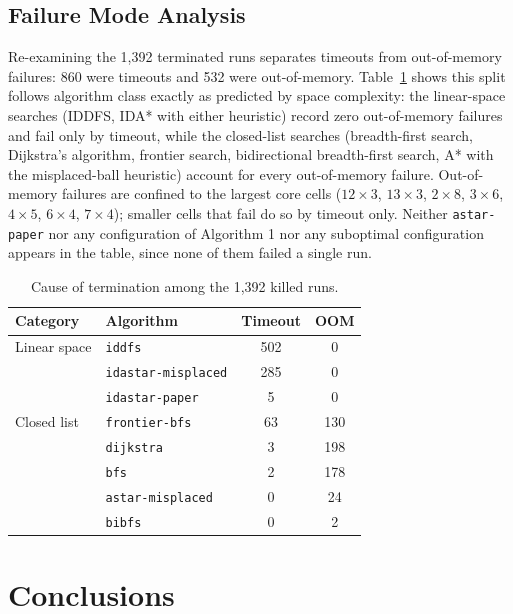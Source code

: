 \documentclass[letterpaper]{article}
\begin{document}
\subsection{Failure Mode Analysis}

Re-examining the 1,392 terminated runs separates timeouts from
out-of-memory failures: 860 were timeouts and 532 were out-of-memory.
Table~\ref{tab:failure} shows this split follows algorithm class exactly as
predicted by space complexity: the linear-space searches (IDDFS, IDA* with
either heuristic) record zero out-of-memory failures and fail only by
timeout, while the closed-list searches (breadth-first search, Dijkstra's
algorithm, frontier search, bidirectional breadth-first search, A* with the
misplaced-ball heuristic) account for every out-of-memory failure.
Out-of-memory failures are confined to the largest core cells ($12\times3$,
$13\times3$, $2\times8$, $3\times6$, $4\times5$, $6\times4$, $7\times4$);
smaller cells that fail do so by timeout only. Neither
\texttt{astar-paper} nor any configuration of Algorithm 1 nor any
suboptimal configuration appears in the table, since none of them failed a
single run.

\begin{table}[t]
\centering
\footnotesize
\caption{Cause of termination among the 1,392 killed runs.}
\label{tab:failure}
\begin{tabular}{llcc}
\hline
Category & Algorithm & Timeout & OOM \\
\hline
Linear space & \texttt{iddfs} & 502 & 0 \\
 & \texttt{idastar-misplaced} & 285 & 0 \\
 & \texttt{idastar-paper} & 5 & 0 \\
Closed list & \texttt{frontier-bfs} & 63 & 130 \\
 & \texttt{dijkstra} & 3 & 198 \\
 & \texttt{bfs} & 2 & 178 \\
 & \texttt{astar-misplaced} & 0 & 24 \\
 & \texttt{bibfs} & 0 & 2 \\
\hline
\end{tabular}
\end{table}

\section{Conclusions}
\end{document}
